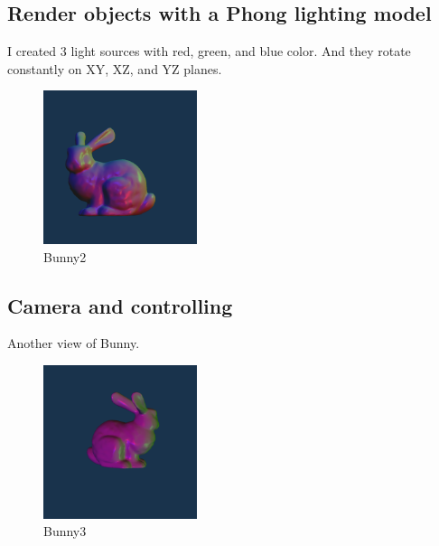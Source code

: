 \documentclass[acmtog]{acmart}
\begin{document}
\subsection{Render objects with a Phong lighting model}
I created 3 light sources with red, green, and blue color.
And they rotate constantly on XY, XZ, and YZ planes.
\begin{figure}[htb]
	\centering
	\includegraphics[width=0.4\textwidth]{fig/fig2.png}
	\caption{Bunny2}
	\label{Bunny2}
\end{figure}

\newpage
\subsection{Camera and controlling}
Another view of Bunny.
\begin{figure}[htb]
	\centering
	\includegraphics[width=0.4\textwidth]{fig/fig3.png}
	\caption{Bunny3}
	\label{Bunny3}
\end{figure}
\end{document}
